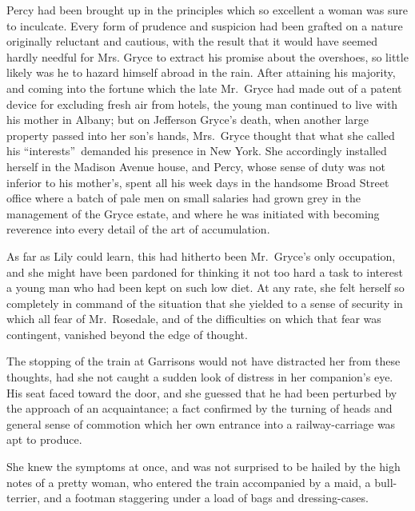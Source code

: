\documentclass[12pt,a4paper]{book}
\begin{document}
Percy had been brought up in the principles which so excellent a
woman was sure to inculcate. Every form of prudence and suspicion
had been grafted on a nature originally reluctant and cautious,
with the result that it would have seemed hardly needful for Mrs.
Gryce to extract his promise about the overshoes, so little
likely was he to hazard himself abroad in the rain. After
attaining his majority, and coming into the fortune which the
late Mr.\ Gryce had made out of a patent device for excluding
fresh air from hotels, the young man continued to live with his
mother in Albany; but on Jefferson Gryce's death, when another
large property passed into her son's hands, Mrs.\ Gryce thought
that what she called his ``interests''\ demanded his presence in New
York. She accordingly installed herself in the Madison Avenue
house, and Percy, whose sense of duty was not inferior to his
mother's, spent all his week days in the handsome Broad Street
office where a batch of pale men on small salaries had grown grey
in the management of the Gryce estate, and where he was initiated
with becoming reverence into every detail of the art of
accumulation.





As far as Lily could learn, this had hitherto been Mr.\ Gryce's
only occupation, and she might have been pardoned for thinking it
not too hard a task to interest a young man who had been kept on
such low diet. At any rate, she felt herself so completely
in command of the situation that she yielded to a sense of
security in which all fear of Mr.\ Rosedale, and of the
difficulties on which that fear was contingent, vanished beyond
the edge of thought.





The stopping of the train at Garrisons would not have distracted
her from these thoughts, had she not caught a sudden look of
distress in her companion's eye. His seat faced toward the door,
and she guessed that he had been perturbed by the approach of an
acquaintance; a fact confirmed by the turning of heads and
general sense of commotion which her own entrance into a
railway-carriage was apt to produce.





She knew the symptoms at once, and was not surprised to be hailed
by the high notes of a pretty woman, who entered the train
accompanied by a maid, a bull-terrier, and a footman staggering
under a load of bags and dressing-cases.
\end{document}
